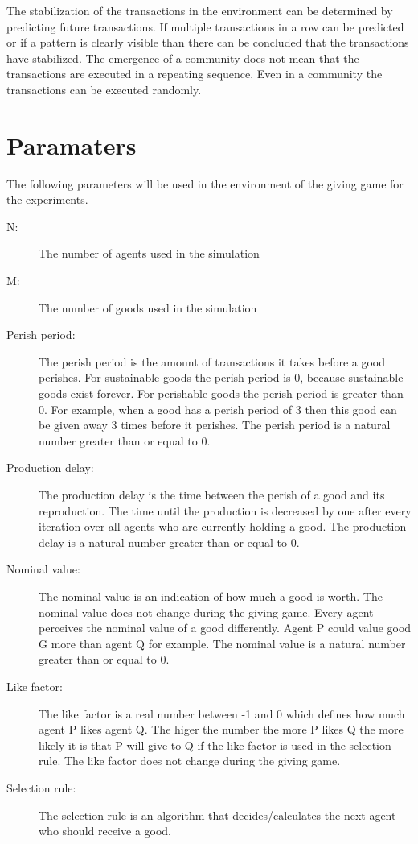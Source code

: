 \documentclass[twoside,openright]{uva-bachelor-thesis}
\begin{document}
The stabilization of the transactions in the environment can be determined by predicting future transactions. If multiple transactions in a row can be predicted or if a pattern is clearly visible than there can be concluded that the transactions have stabilized. The emergence of a community does not mean that the transactions are executed in a repeating sequence. Even in a community the transactions can be executed randomly.


\section{Paramaters}
The following parameters will be used in the environment of the giving game for the experiments.

\begin{description}
  \item[N:] The number of agents used in the simulation
  \item[M:] The number of goods used in the simulation
  \item[Perish period:] The perish period is the amount of transactions it takes before a good perishes. For sustainable goods the perish period is 0, because sustainable goods exist forever. For perishable goods the perish period is greater than 0. For example, when a good has a perish period of 3 then this good can be given away 3 times before it perishes. The perish period is a natural number greater than or equal to 0.
  \item[Production delay:] The production delay is the time between the perish of a good and its reproduction. The time until the production is decreased by one after every iteration over all agents who are currently holding a good. The production delay is a natural number greater than or equal to 0.
  \item[Nominal value:] The nominal value is an indication of how much a good is worth. The nominal value does not change during the giving game. Every agent perceives the nominal value of a good differently. Agent P could value good G more than agent Q for example. The nominal value is a natural number greater than or equal to 0.
  \item[Like factor:] The like factor is a real number between -1 and 0 which defines how much agent P likes agent Q. The higer the number the more P likes Q the more likely it is that P will give to Q if the like factor is used in the selection rule. The like factor does not change during the giving game. 
  \item[Selection rule:] The selection rule is an algorithm that decides/calculates the next agent who should receive a good.

\end{description}
\end{document}
